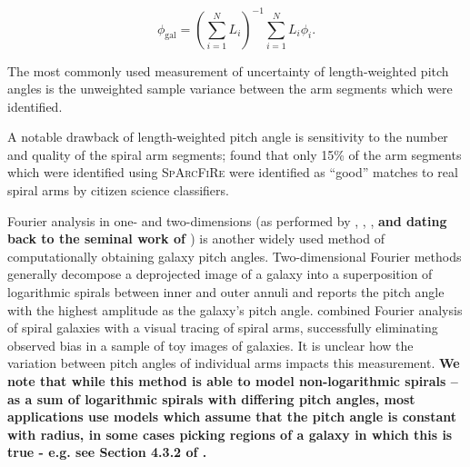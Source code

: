 \begin{equation}
  \phi_\mathrm{gal} = \left(\sum_{i=1}^{N}L_i\right)^{-1}\sum_{i=1}^{N}L_i \phi_i.
\end{equation}

The most commonly used measurement of uncertainty of length-weighted pitch angles is the unweighted sample variance between the arm segments which were identified.

A notable drawback of length-weighted pitch angle is sensitivity to the number and quality of the spiral arm segments; \citet{2017MNRAS.472.2263H} found that only 15\% of the arm segments which were identified using \textsc{SpArcFiRe} \citep{2014ApJ...790...87D} were identified as ``good'' matches to real spiral arms by citizen science classifiers.

Fourier analysis in one- and two-dimensions (as performed by \citealt{2019arXiv190804246D}, \citealt{2012ApJS..199...33D}, \citealt{2018MNRAS.474.2594M}, \textbf{and dating back to the seminal work of \citealt{ConsidereAthanassoula1988}}) is another widely used method of computationally obtaining galaxy pitch angles. Two-dimensional Fourier methods generally decompose a deprojected image of a galaxy into a superposition of logarithmic spirals between inner and outer annuli \citep{2012ApJS..199...33D} and reports the pitch angle with the highest amplitude as the galaxy's pitch angle. \citet{2020MNRAS.493.3854H} combined Fourier analysis of spiral galaxies with a visual tracing of spiral arms, successfully eliminating observed bias in a sample of toy images of galaxies. It is unclear how the variation between pitch angles of individual arms impacts this measurement. \textbf{We note that while this method is able to model non-logarithmic spirals -- as a sum of logarithmic spirals with differing pitch angles, most applications use models which assume that the pitch angle is constant with radius, in some cases picking regions of a galaxy in which this is true - e.g. see Section 4.3.2 of \citealt{2012ApJS..199...33D}.}

